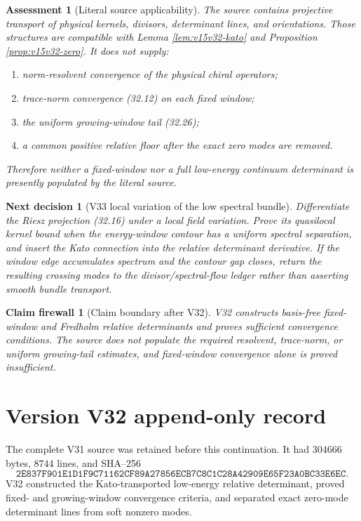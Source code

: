 \documentclass[11pt]{article}
\newtheorem{firewall}[theorem]{Claim firewall}
\newtheorem{decision}[theorem]{Next decision}
\newtheorem{assessment}[theorem]{Assessment}
\theoremstyle{remark}
\begin{document}
\begin{assessment}[Literal source applicability]
\label{ass:v15v32-source}
The source contains projective transport of physical kernels,
divisors, determinant lines, and orientations.  Those structures
are compatible with Lemma \ref{lem:v15v32-kato} and Proposition
\ref{prop:v15v32-zero}.  It does not supply:
\begin{enumerate}
\item norm-resolvent convergence of the physical chiral operators;
\item trace-norm convergence (32.12) on each fixed window;
\item the uniform growing-window tail (32.26);
\item a common positive relative floor after the exact zero modes
      are removed.
\end{enumerate}
Therefore neither a fixed-window nor a full low-energy continuum
determinant is presently populated by the literal source.
\end{assessment}

\begin{decision}[V33 local variation of the low spectral bundle]
\label{dec:v15v32-next}
Differentiate the Riesz projection (32.16) under a local field
variation.  Prove its quasilocal kernel bound when the energy-window
contour has a uniform spectral separation, and insert the Kato
connection into the relative determinant derivative.  If the
window edge accumulates spectrum and the contour gap closes, return
the resulting crossing modes to the divisor/spectral-flow ledger
rather than asserting smooth bundle transport.
\end{decision}

\begin{firewall}[Claim boundary after V32]
\label{fire:v15v32}
V32 constructs basis-free fixed-window and Fredholm relative
determinants and proves sufficient convergence conditions.  The
source does not populate the required resolvent, trace-norm, or
uniform growing-tail estimates, and fixed-window convergence alone
is proved insufficient.
\end{firewall}

\section*{Version V32 append-only record}
The complete V31 source was retained before this continuation.  It
had \(304666\) bytes, \(8744\) lines, and SHA--256
\[
 \texttt{2E837F901E1D1F9C71162CF89A27856ECB7C8C1C28A42909E65F23A0BC33E6EC}.
\]
V32 constructed the Kato-transported low-energy relative
determinant, proved fixed- and growing-window convergence criteria,
and separated exact zero-mode determinant lines from soft nonzero
modes.
\end{document}
